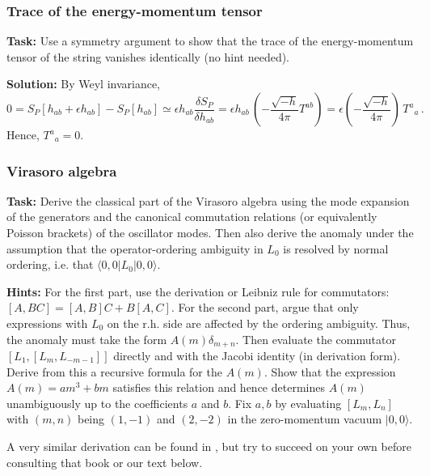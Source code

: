 \documentclass[12pt]{article}
\newcommand{\be}{\begin{equation}}
\newcommand{\ee}{\end{equation}}
\numberwithin{equation}{section}
\begin{document}
\subsubsection{Trace of the energy-momentum tensor}

{\bf Task:} Use a symmetry argument to show that the trace of the energy-momentum tensor of the string vanishes identically (no hint needed).

\noindent
{\bf Solution:} By Weyl invariance,
\be
0=S_P[h_{ab}+\epsilon h_{ab}]-S_P[h_{ab}]\simeq \epsilon h_{ab}\frac{\delta S_P}{\delta h_{ab}}=\epsilon h_{ab}\,\left(-\frac{\sqrt{-h}}{4\pi}T^{ab} \right)=\epsilon \left(-\frac{\sqrt{-h}}{4\pi}\right)\,T^a{}_a\,.
\ee
Hence, $T^a{}_a=0$. 






\subsubsection{Virasoro algebra}

{\bf Task:} Derive the classical part of the Virasoro algebra using the mode expansion of the generators and the canonical commutation relations (or equivalently Poisson brackets) of the oscillator modes. Then also derive the anomaly under the assumption that the operator-ordering ambiguity in $L_0$ is resolved by normal ordering, i.e. that $\langle 0,0|L_0|0,0\rangle$.

\noindent
{\bf Hints:} For the first part, use the derivation or Leibniz rule for commutators: $[A,BC]=[A,B]C+B[A,C]$. For the second part, argue that only expressions with $L_0$ on the r.h. side are affected by the ordering ambiguity. Thus, the anomaly must take the form $A(m)\delta_{m+n}$. Then evaluate the commutator $[L_1,[L_m,L_{-m-1}]]$ directly and with the Jacobi identity (in derivation form). Derive from this a recursive formula for the $A(m)$. Show that the expression $A(m)=am^3+bm$ satisfies this relation and hence determines $A(m)$ unambiguously up to the coefficients $a$ and $b$. Fix $a,b$ by evaluating $[L_m,L_n]$ with $(m,n)$ being $(1,-1)$ and $(2,-2)$ in the zero-momentum vacuum $|0,0\rangle$. 

A very similar derivation can be found in \cite{Green:1987sp}, but try to succeed on your own before consulting that book or our text below.
\end{document}
